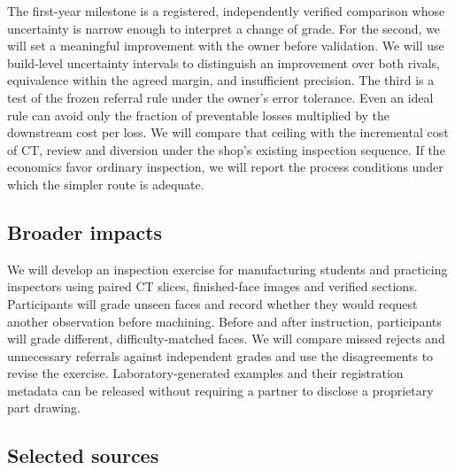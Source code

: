 \documentclass[11pt,letterpaper]{article}
\begin{document}
The first-year milestone is a registered, independently verified comparison whose uncertainty is narrow enough to interpret a change of grade. For the second, we will set a meaningful improvement with the owner before validation. We will use build-level uncertainty intervals to distinguish an improvement over both rivals, equivalence within the agreed margin, and insufficient precision. The third is a test of the frozen referral rule under the owner’s error tolerance. Even an ideal rule can avoid only the fraction of preventable losses multiplied by the downstream cost per loss. We will compare that ceiling with the incremental cost of CT, review and diversion under the shop’s existing inspection sequence. If the economics favor ordinary inspection, we will report the process conditions under which the simpler route is adequate.

\subsection*{Broader impacts}

We will develop an inspection exercise for manufacturing students and practicing inspectors using paired CT slices, finished-face images and verified sections. Participants will grade unseen faces and record whether they would request another observation before machining. Before and after instruction, participants will grade different, difficulty-matched faces. We will compare missed rejects and unnecessary referrals against independent grades and use the disagreements to revise the exercise. Laboratory-generated examples and their registration metadata can be released without requiring a partner to disclose a proprietary part drawing.

\subsection*{Selected sources}
\end{document}

